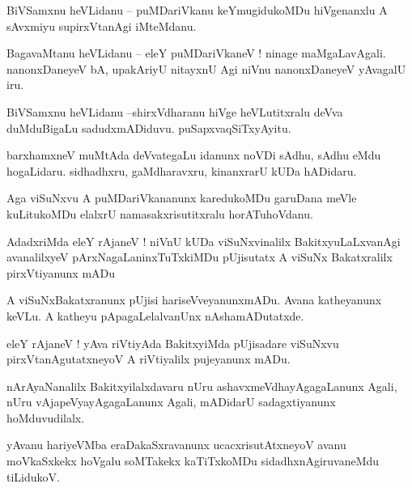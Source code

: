 \documentclass{article}
\begin{document}
\begin{mn}%
BiVSamxnu heVLidanu -- puMDariVkanu keYmugidukoMDu hiVgenanxlu A sAvxmiyu supirxVtanAgi iMteMdanu.
\end{mn}

\begin{mn}%
BagavaMtanu heVLidanu -- eleY puMDariVkaneV ! ninage maMgaLavAgali. nanonxDaneyeV bA, upakAriyU 
nitayxnU Agi niVnu nanonxDaneyeV yAvagalU iru.
\end{mn}

\begin{mn}%
BiVSamxnu heVLidanu --shirxVdharanu hiVge heVLutitxralu deVva duMduBigaLu sadudxmADiduvu. 
puSapxvaqSiTxyAyitu.
\end{mn}

\begin{mn}%
barxhamxneV muMtAda deVvategaLu idanunx noVDi sAdhu, sAdhu eMdu hogaLidaru. sidhadhxru, 
gaMdharavxru, kinanxrarU kUDa hADidaru.
\end{mn}

\begin{mn}%
Aga viSuNxvu A puMDariVkananunx karedukoMDu garuDana meVle kuLitukoMDu elalxrU namasakxrisutitxralu 
horATuhoVdanu.
\end{mn}

\begin{mn}%
AdadxriMda eleY rAjaneV ! niVnU kUDa viSuNxvinalilx BakitxyuLaLxvanAgi avanalilxyeV 
pArxNagaLaninxTuTxkiMDu pUjisutatx A viSuNx Bakatxralilx pirxVtiyanunx mADu
\end{mn}

\begin{mn}%
A viSuNxBakatxranunx pUjisi hariseVveyanunxmADu. Avana katheyanunx keVLu. A katheyu 
pApagaLelalvanUnx nAshamADutatxde.
\end{mn}

\begin{mn}%
eleY rAjaneV ! yAva riVtiyAda BakitxyiMda pUjisadare viSuNxvu pirxVtanAgutatxneyoV A riVtiyalilx 
pujeyanunx mADu.
\end{mn}

\begin{mn}%
nArAyaNanalilx Bakitxyilalxdavaru nUru ashavxmeVdhayAgagaLanunx Agali, nUru vAjapeVyayAgagaLanunx 
Agali, mADidarU sadagxtiyanunx hoMduvudilalx.
\end{mn}

\begin{mn}%
yAvanu hariyeVMba eraDakaSxravanunx ucacxrisutAtxneyoV avanu moVkaSxkekx hoVgalu soMTakekx 
kaTiTxkoMDu sidadhxnAgiruvaneMdu tiLidukoV.
\end{mn}
\end{document}
